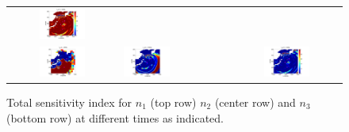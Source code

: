 \begin{figure}[ht]
\begin{tabular}{clc}
\hspace*{-45pt}
\includegraphics[width=0.45\textwidth]{./figures/T22d4.pdf} \\
\hspace*{-55pt}
\includegraphics[width=0.45\textwidth]{./figures/T32d1.pdf} &
\hspace*{-45pt}
\includegraphics[width=0.45\textwidth]{./figures/T32d3.pdf} &
\hspace*{-45pt}
\includegraphics[width=0.45\textwidth]{./figures/T32d4.pdf}
\end{tabular}
\caption{Total sensitivity index for $n_1$ (top row) $n_2$ (center row) and $n_3$ (bottom row)
 at different times as indicated.}
\label{fig:sens2d}
\end{figure}
